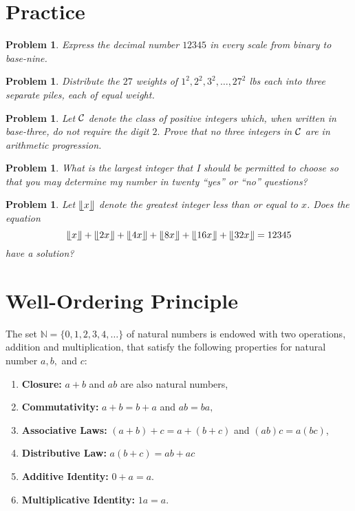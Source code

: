 \documentclass[11pt, openany]{book}
\theoremstyle{change} \theoremheaderfont{\blue\sffamily\bfseries}
\newtheorem{pro}[thm]{Problem}
\theoremstyle{nonumberplain} \theoremheaderfont{\sffamily\bfseries}
\newcommand{\BBN}{\mathbb{N}}
\newcommand{\í}{\'{\i}}
\begin{document}
\section*{Practice}\begin{multicols}{2}\columnseprule 1pt \columnsep 25pt
\begin{pro}
Express the decimal number $12345$ in every scale from binary to
base-nine.
\end{pro}
\begin{pro}
Distribute the $27$ weights of $1^2, 2^2, 3^2, \ldots , 27^2$ lbs
each into three separate piles, each of equal weight.
\end{pro}
\begin{pro}
Let ${\cal C}$ denote the class of positive integers which, when
written in base-three, do not require the digit $2.$ Prove that no
three integers in ${\cal C}$ are in arithmetic progression.
\end{pro}
\begin{pro}
What is the largest integer that I should be permitted to choose
so that you may determine my number in twenty ``yes'' or ``no''
questions?
\end{pro}
\begin{pro}
Let $\llfloor x \rrfloor$ denote the greatest integer less than or
equal to $x$. Does the equation
$$\llfloor x\rrfloor  + \llfloor 2x\rrfloor + \llfloor 4x\rrfloor + \llfloor 8x\rrfloor + \llfloor 16x\rrfloor
+ \llfloor 32x\rrfloor = 12345$$have a solution?
\end{pro}
\end{multicols}
\section{Well-Ordering Principle} The set $\BBN =
\{0, 1, 2, 3, 4, \ldots  \}$ of natural numbers is endowed with
two operations, addition and multiplication, that satisfy the
following properties for natural number $a, b,$ and $c$:
\begin{enumerate}
\item {\bf Closure:} $a + b$ and $ab$ are also natural numbers,
\item {\bf Commutativity:} $a + b = b + a$ and $ab = ba,$ \item
{\bf Associative Laws:} $(a + b) + c = a + (b + c)$ and $(ab)c =
a(bc)$, \item {\bf Distributive Law:} $a(b + c) = ab + ac$ \item
{\bf Additive Identity:} $0 + a = a.$ \item {\bf Multiplicative
Identity:} $1a = a.$
\end{enumerate}
\end{document}
